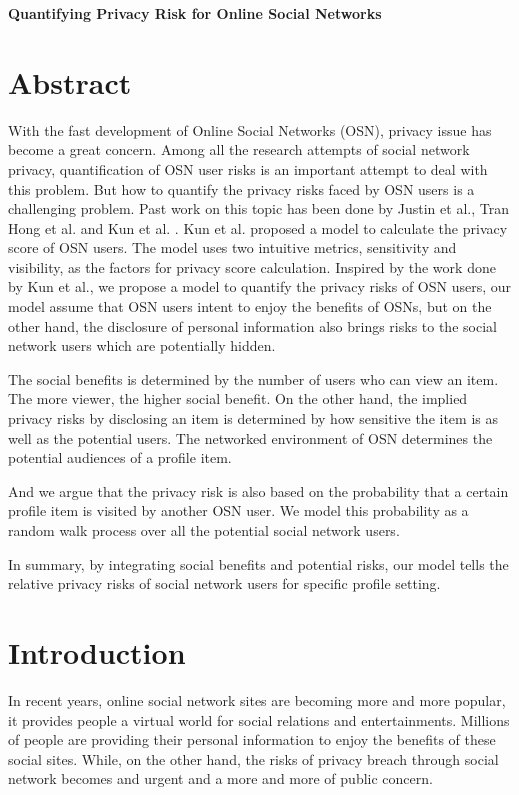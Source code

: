 \documentclass[a4paper]{article}
\begin{document}
\begin{center}
\textbf{\LARGE{Quantifying Privacy Risk for Online Social Networks}}
\end{center}

\section{Abstract\label{sec:intro}}
With the fast development of Online Social Networks (OSN), privacy
issue has become a great concern. Among all the research attempts of
social network privacy, quantification of OSN user risks is an
important attempt to deal with this problem. But how to quantify the
privacy risks faced by OSN users is a challenging problem. Past work
on this topic has been done by Justin et
al.\cite{measure-privacy-risk}, Tran Hong et
al. \cite{SN-quantify-privacy} and Kun et
al. \cite{SN-privacy-score}. Kun et al. proposed a model to calculate
the privacy score of OSN users. The model uses two intuitive metrics,
sensitivity and visibility, as the factors for privacy score
calculation. Inspired by the work done by Kun et al., we propose a
model to quantify the privacy risks of OSN users, our model assume
that OSN users intent to enjoy the benefits of OSNs, but on the other
hand, the disclosure of personal information also brings risks to the
social network users which are potentially hidden.

The social benefits is determined by the number of users who can view
an item. The more viewer, the higher social benefit. On the other
hand, the implied privacy risks by disclosing an item is determined by
how sensitive the item is as well as the potential users. The
networked environment of OSN determines the potential audiences of a
profile item.

And we argue that the privacy risk is also based on the probability
that a certain profile item is visited by another OSN user. We model
this probability as a random walk process over all the potential
social network users. 

In summary, by integrating social benefits and potential risks, our
model tells the relative privacy risks of social network users for
specific profile setting. 

\section{Introduction}
In recent years, online social network sites are becoming more and
more popular, it provides people a virtual world for social relations
and entertainments. Millions of people are providing their personal
information to enjoy the benefits of these social sites. While, on the
other hand, the risks of privacy breach through social network becomes
and urgent and a more and more of public concern. 
\end{document}
